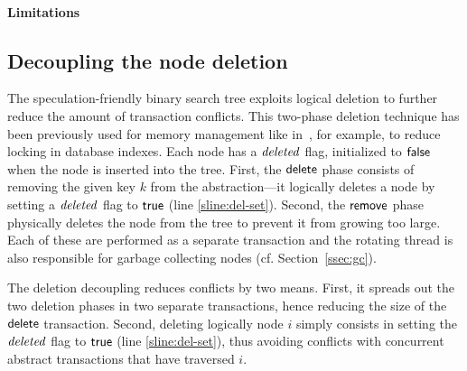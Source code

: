 \paragraph{Limitations}


\subsection{Decoupling the node deletion}

The speculation-friendly binary search tree exploits logical deletion to further reduce the amount of transaction conflicts.
This two-phase deletion technique has been previously used for memory management 
like in~\cite{Moh90}, for example, to reduce locking in database indexes.
Each node has a $\ms{deleted}$ flag, initialized to $\lit{false}$ when the node is inserted into the tree.
First, the $\act{delete}$ phase consists of removing the given key $k$ from the abstraction---it logically deletes a node by setting a $\ms{deleted}$ flag to $\lit{true}$ (line \ref{sline:del-set}).
Second, the $\act{remove}$ phase physically deletes the node from the tree to prevent it from growing too large.
Each of these are performed as a separate transaction and the rotating thread is also responsible for garbage collecting nodes (cf. Section~\ref{ssec:gc}).

The deletion decoupling reduces conflicts by two means. 
First, it spreads out the two deletion phases in two separate transactions, hence reducing the size of the $\act{delete}$ transaction.
Second, deleting logically node $i$ simply consists in setting the $\ms{deleted}$ flag to $\lit{true}$ (line \ref{sline:del-set}), thus avoiding conflicts
with concurrent abstract transactions that have traversed $i$.

